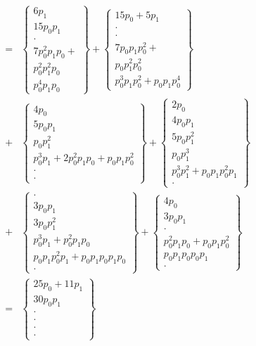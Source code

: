 \documentclass[a4paper,12pt]{article}
\numberwithin{definition}{section}
\numberwithin{lemma}{section}
\numberwithin{proposition}{section}
\numberwithin{theorem}{section}
\numberwithin{grammar}{section}
\numberwithin{program}{section}
\numberwithin{convention}{section}
\numberwithin{corollary}{section}
\numberwithin{principle}{section}
\begin{document}
$$\begin{array}{lcl}
    & = & \begin{Bmatrix} 6 p_1 \\ 15 p_0 p_1 \\ \cdot \\ 7 p_0^2 p_1 p_0 + \\ p_0^2 p_1^2 p_0 \\ p_0^4 p_1 p_0 \end{Bmatrix} +
          \begin{Bmatrix} 15 p_0 + 5 p_1 \\ \cdot \\ \cdot \\ 7 p_0 p_1 p_0^2 + \\ p_0 p_1^2 p_0^2 \\ p_0^3 p_1 p_0^2 + p_0 p_1 p_0^4 \end{Bmatrix} \\
    & + & \begin{Bmatrix} 4 p_0 \\ 5 p_0 p_1 \\ p_0 p_1^2 \\ p_0^3 p_1 + 2 p_0^2 p_1 p_0 + p_0 p_1 p_0^2 \\ \cdot \\ \cdot \end{Bmatrix} +
          \begin{Bmatrix} 2 p_0 \\ 4 p_0 p_1 \\ 5 p_0 p_1^2 \\ p_0 p_1^3 \\ p_0^3 p_1^2 + p_0 p_1 p_0^2 p_1 \\ \cdot \end{Bmatrix} \\
    & + & \begin{Bmatrix} \cdot \\ 3 p_0 p_1 \\ 3 p_0 p_1^2 \\ p_0^3 p_1 + p_0^2 p_1 p_0 \\ p_0 p_1 p_0^2 p_1 + p_0 p_1 p_0 p_1 p_0 \\ \cdot \end{Bmatrix} +
          \begin{Bmatrix} 4 p_0 \\ 3 p_0 p_1 \\ \cdot \\ p_0^2 p_1 p_0 + p_0 p_1 p_0^2 \\ p_0 p_1 p_0 p_0 p_1 \\ \cdot  \end{Bmatrix} \\
    & = & \begin{Bmatrix} 25 p_0 + 11 p_1 \\ 30 p_0 p_1 \\ \cdot \\ \cdot  \\ \cdot \\ \cdot \end{Bmatrix}
\end{array}$$
\end{document}
